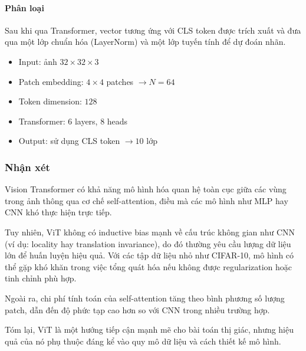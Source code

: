 \paragraph{Phân loại}

Sau khi qua Transformer, vector tương ứng với CLS token được trích xuất và đưa qua một lớp chuẩn hóa (LayerNorm) và một lớp tuyến tính để dự đoán nhãn.

\begin{itemize}
\item Input: ảnh $32 \times 32 \times 3$
\item Patch embedding: $4 \times 4$ patches $\rightarrow N = 64$
\item Token dimension: $128$
\item Transformer: $6$ layers, $8$ heads
\item Output: sử dụng CLS token $\rightarrow 10$ lớp
\end{itemize}

\subsubsection{Nhận xét}

Vision Transformer có khả năng mô hình hóa quan hệ toàn cục giữa các vùng trong ảnh thông qua cơ chế self-attention, điều mà các mô hình như MLP hay CNN khó thực hiện trực tiếp.

Tuy nhiên, ViT không có inductive bias mạnh về cấu trúc không gian như CNN (ví dụ: locality hay translation invariance), do đó thường yêu cầu lượng dữ liệu lớn để huấn luyện hiệu quả. Với các tập dữ liệu nhỏ như CIFAR-10, mô hình có thể gặp khó khăn trong việc tổng quát hóa nếu không được regularization hoặc tinh chỉnh phù hợp.

Ngoài ra, chi phí tính toán của self-attention tăng theo bình phương số lượng patch, dẫn đến độ phức tạp cao hơn so với CNN trong nhiều trường hợp.

Tóm lại, ViT là một hướng tiếp cận mạnh mẽ cho bài toán thị giác, nhưng hiệu quả của nó phụ thuộc đáng kể vào quy mô dữ liệu và cách thiết kế mô hình.